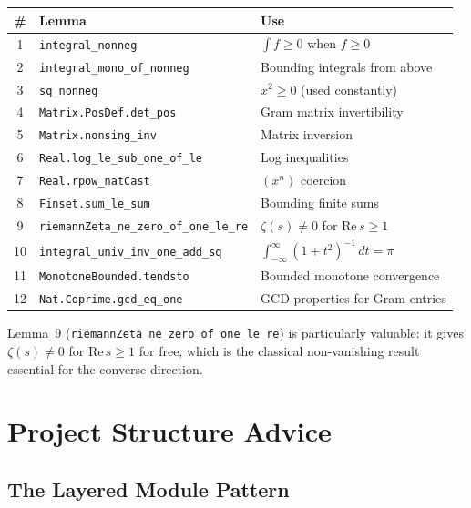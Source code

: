 \documentclass[11pt,a4paper]{article}
\newcommand{\lean}[1]{\texttt{#1}}
\begin{document}
\begin{center}
\small
\begin{tabular}{@{}clp{5.5cm}@{}}
\toprule
\textbf{\#} & \textbf{Lemma} & \textbf{Use} \\
\midrule
1 & \lean{integral\_nonneg} & $\int f \geq 0$ when $f \geq 0$ \\
2 & \lean{integral\_mono\_of\_nonneg} & Bounding integrals from above \\
3 & \lean{sq\_nonneg} & $x^2 \geq 0$ (used constantly) \\
4 & \lean{Matrix.PosDef.det\_pos} & Gram matrix invertibility \\
5 & \lean{Matrix.nonsing\_inv} & Matrix inversion \\
6 & \lean{Real.log\_le\_sub\_one\_of\_le} & Log inequalities \\
7 & \lean{Real.rpow\_natCast} & $(x^n)$ coercion \\
8 & \lean{Finset.sum\_le\_sum} & Bounding finite sums \\
9 & \lean{riemannZeta\_ne\_zero\_of\_one\_le\_re} & $\zeta(s) \neq 0$ for $\mathrm{Re}\,s \geq 1$ \\
10 & \lean{integral\_univ\_inv\_one\_add\_sq} & $\int_{-\infty}^{\infty} (1+t^2)^{-1}\,dt = \pi$ \\
11 & \lean{MonotoneBounded.tendsto} & Bounded monotone convergence \\
12 & \lean{Nat.Coprime.gcd\_eq\_one} & GCD properties for Gram entries \\
\bottomrule
\end{tabular}
\end{center}

Lemma~9 (\lean{riemannZeta\_ne\_zero\_of\_one\_le\_re}) is particularly
valuable: it gives $\zeta(s) \neq 0$ for $\mathrm{Re}\,s \geq 1$ for
free, which is the classical non-vanishing result essential for the
converse direction.

\section{Project Structure Advice}
\label{sec:structure}

\subsection{The Layered Module Pattern}
\end{document}
